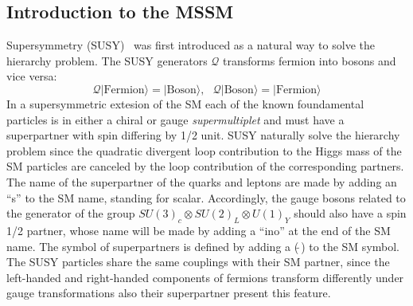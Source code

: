 \subsection{Introduction to the MSSM}
Supersymmetry (SUSY)~\cite{Susy1,Susy2,Susy3} was first introduced as a natural way to solve the hierarchy problem.
The SUSY generators $\mathcal{Q}$ transforms fermion into bosons and vice versa:
\begin{equation}
\mathcal{Q}|\text{Fermion}\rangle = |\text{Boson}\rangle, ~ ~ ~ \mathcal{Q}|\text{Boson}\rangle = |\text{Fermion}\rangle
\end{equation}
In a supersymmetric extesion of the SM  each of the known foundamental particles 
is in either a chiral or gauge \emph{supermultiplet} and must have a superpartner with spin differing by 1/2 unit.
SUSY naturally solve the hierarchy problem since the quadratic divergent loop contribution to the Higgs mass of the SM 
particles are canceled by the loop contribution of the corresponding partners. 
The name of the superpartner of the quarks and leptons are made by adding an ``s'' to the SM name, standing for scalar.
Accordingly, the gauge bosons related to the generator of the group $SU(3)_c \otimes SU(2)_L \otimes U(1)_Y$ should also have a spin 1/2 partner,
whose name will be made by adding a ``ino'' at the end of the SM name. The symbol of superpartners is defined by adding a ($\tilde{ ~ }$) to the SM symbol.
The SUSY particles share the same couplings with their SM partner, since the left-handed and right-handed components of fermions 
transform differently under gauge transformations also their superpartner present this feature.

